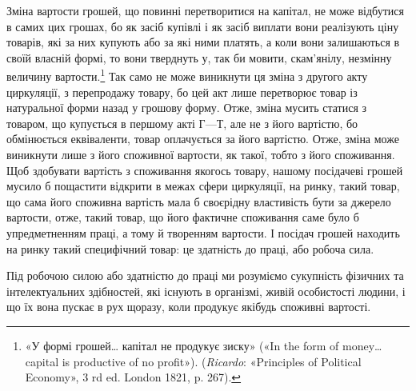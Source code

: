 Зміна вартости грошей, що повинні перетворитися на капітал,
не може відбутися в самих цих грошах, бо як засіб купівлі і як
засіб виплати вони реалізують ціну товарів, які за них купують
або за які ними платять, а коли вони залишаються в своїй власній
формі, то вони тверднуть у, так би мовити, скам’янілу, незмінну
величину вартости.\footnote{
«У формі грошей\dots{} капітал не продукує зиску» («In the form of
money\dots{} capital is productive of no profit»). (\emph{Ricardo}: «Principles
of Political Economy», 3 rd ed. London 1821, p. 267).
} Так само не може виникнути ця зміна з
другого акту циркуляції, з перепродажу товару, бо цей акт лише
перетворює товар із натуральної форми назад у грошову форму.
Отже, зміна мусить статися з товаром, що купується в першому
акті $Г — Т$, але не з його вартістю, бо обмінюється еквіваленти,
товар оплачується за його вартістю. Отже, зміна може виникнути
лише з його споживної вартости, як такої, тобто з його споживання.
Щоб здобувати вартість з споживання якогось товару, нашому
посідачеві грошей мусило б пощастити відкрити в межах сфери
циркуляції, на ринку, такий товар, що сама його споживна вартість
мала б своєрідну властивість бути за джерело вартости,
отже, такий товар, що його фактичне споживання саме було б
упредметненням праці, а тому й творенням вартости. І посідач
грошей находить на ринку такий специфічний товар: це здатність
до праці, або робоча сила.

Під робочою силою або здатністю до праці ми розуміємо
сукупність фізичних та інтелектуальних здібностей, які існують
в організмі, живій особистості людини, і що їх вона пускає в рух
щоразу, коли продукує якібудь споживні вартості.
\parbreak{}
